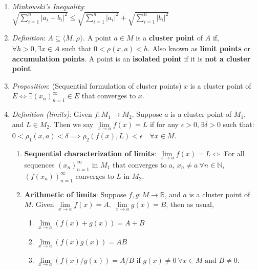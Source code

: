 \documentclass[10pt]{article}
\newcommand{\seqn}[1]{(#1)^\infty_{n=1}}
\newcommand{\real}{\mathbb{R}}
\newcommand{\nat}{\mathbb{N}}
\newcommand{\met}[1]{\langle M_{#1},\rho_{#1}\rangle}
\begin{document}
\begin{multicols*}{3}
\begin{enumerate}
		\item \emph{Minkowski's Inequality}:\\
			$\sqrt{\sum\limits_{i=1}^{n}|a_{i}+b_{i}|^{2}}\leq
			\sqrt{\sum\limits_{i=1}^{n}|a_{i}|^{2}}+\sqrt{\sum\limits_{i=1}^{n}|b_{i}|^{2}}$
		\item \emph{Definition}: $A\subseteq \met{}$. A point $a\in M$ is a
			\textbf{cluster point} of $A$ if, $\forall h>0,\exists x\in A$ such that
			$0<\rho(x,a)<h$. Also known as \textbf{limit points} or
			\textbf{accumulation points}. A point is an \textbf{isolated point} if it
			is \textbf{not a cluster point}.
		\item \emph{Proposition}: (Sequential formulation of cluster points) $x$ is
			a cluster point of $E \iff\exists\seqn{x_{n}}\in E$ that converges to $x$.
		\item \emph{Definition (limits)}: Given $f:M_{1}\to M_{2}$.
			Suppose $a$ is a cluster point of $M_{1}$, and
			$L\in M_{2}$. Then we say $\lim\limits_{x\to a}f(x)=L$ if
			for any $\epsilon>0, \exists\delta>0$ such that:\\
			$0<\rho_{1}(x,a)<\delta\implies\rho_{2}(f(x),L)<\epsilon\quad\forall x\in M$.
			\begin{enumerate}
				\item \textbf{Sequential characterization of limits}:
					$\lim\limits_{x\to a}f(x)=L\iff$ For all sequences $\seqn{x_{n}}$ in
					$M_{1}$ that converges to a, $x_{n}\neq a\ \forall n\in\nat$,
					$\seqn{f(x_{n})}$ converges to $L$ in $M_{2}$.
				\item \textbf{Arithmetic of limits}: Suppose $f,g:M\to\real$, and $a$ is
					a cluster point of $M$. Given
					$\lim\limits_{x\to a}f(x)=A,\ \lim\limits_{x\to a}g(x)=B$, then as
					usual,
					\begin{enumerate}
						\item $\lim\limits_{x\to a}(f(x)+g(x))=A+B$
						\item $\lim\limits_{x\to a}(f(x)g(x))=AB$
						\item $\lim\limits_{x\to a}(f(x)/g(x))=A/B$ if
							$g(x)\neq 0\ \forall x\in M\text{ and }B\neq0$.
					\end{enumerate}
			\end{enumerate}

	\end{enumerate}


\end{multicols*}
\end{document}
